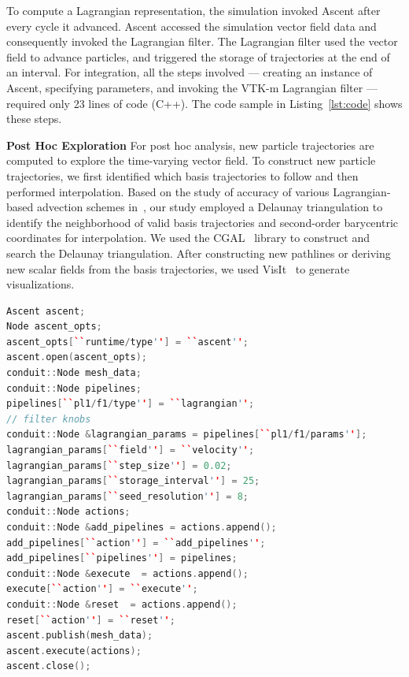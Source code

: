 To compute a Lagrangian representation, the simulation invoked Ascent after every cycle it advanced.
%
Ascent accessed the simulation vector field data and consequently invoked the Lagrangian filter. 
%
The Lagrangian filter used the vector field to advance particles, and triggered the storage of trajectories at the end of an interval.
%
%
For integration, all the steps involved --- creating an instance of Ascent, specifying parameters, and invoking the VTK-m Lagrangian filter --- required only 23 lines of code (C++). %
%
The code sample in Listing~\ref{lst:code} shows these steps. 
%

\noindent\textbf{Post Hoc Exploration}
For post hoc analysis, new particle trajectories are computed to explore the time-varying vector field. %
%
To construct new particle trajectories, we first identified which basis trajectories to follow and then performed interpolation.
%
Based on the study of accuracy of various Lagrangian-based advection schemes in~\cite{agranovsky2015subsampling}, our study employed a Delaunay triangulation to identify the neighborhood of valid basis trajectories and second-order barycentric coordinates for interpolation.
%
We used the CGAL~\cite{fabri2011cgal} library to construct and search the Delaunay triangulation.
%
After constructing new pathlines or deriving new scalar fields from the basis trajectories, we used VisIt~\cite{childs2012visit} to generate visualizations.

\begin{lstlisting}[basicstyle=\footnotesize, label={lst:code}, caption=Ascent example., language=C++] 
Ascent ascent;
Node ascent_opts;
ascent_opts[``runtime/type''] = ``ascent'';
ascent.open(ascent_opts);
conduit::Node mesh_data;
conduit::Node pipelines;
pipelines[``pl1/f1/type''] = ``lagrangian'';
// filter knobs
conduit::Node &lagrangian_params = pipelines[``pl1/f1/params''];
lagrangian_params[``field''] = ``velocity'';
lagrangian_params[``step_size''] = 0.02; 
lagrangian_params[``storage_interval''] = 25; 
lagrangian_params[``seed_resolution''] = 8; 
conduit::Node actions;
conduit::Node &add_pipelines = actions.append();
add_pipelines[``action''] = ``add_pipelines'';
add_pipelines[``pipelines''] = pipelines;
conduit::Node &execute  = actions.append();
execute[``action''] = ``execute'';
conduit::Node &reset  = actions.append();
reset[``action''] = ``reset'';
ascent.publish(mesh_data);
ascent.execute(actions);
ascent.close();
\end{lstlisting}
%
%
%
%


